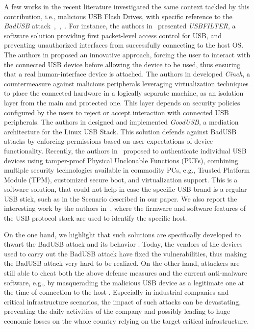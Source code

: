 \documentclass[acmsmall, authorversion]{acmart}
\begin{document}
A few works in the recent literature investigated the same context tackled by this contribution, i.e., malicious USB Flash Drives, with specific reference to the \emph{BadUSB} attack~\cite{Tian2016},~\cite{angel2016_usenix},~\cite{Tian2015}. For instance, the authors in~\cite{Tian2016} presented \emph{USBFILTER}, a software solution providing first packet-level access control for USB, and preventing unauthorized interfaces from successfully connecting to the host \ac{OS}. The authors in \cite{Griscioli2016} proposed an innovative approach, forcing the user to interact with the connected USB device before allowing the device to be used, thus ensuring that a real human-interface device is attached. The authors in \cite{angel2016_usenix} developed \emph{Cinch}, a countermeasure against malicious peripherals leveraging virtualization techniques to place the connected hardware in a logically separate machine, as an isolation layer from the main and protected one. This layer depends on security policies configured by the users to reject or accept interaction with connected USB peripherals. The authors in \cite{Tian2015} designed and implemented \emph{GoodUSB}, a mediation architecture for the Linux USB Stack. This solution defends against BadUSB attacks by enforcing permissions based on user expectations of device functionality. 
Recently, the authors in~\cite{suzaki2019} proposed to authenticate individual USB devices using tamper-proof Physical Unclonable Functions (PUFs), combining multiple security technologies available in commodity PCs, e.g., Trusted Platform Module (TPM), customized secure boot, and virtualization support. This is a software solution, that could not help in case the specific USB brand is a regular USB stick, such as in the Scenario described in our paper. We also report the interesting work by the authors in~\cite{bates2014}, where the firmware and software features of the USB protocol stack are used to identify the specific host.

On the one hand, we highlight that such solutions are specifically developed to thwart the BadUSB attack and its behavior \cite{badusbguide}. Today, the vendors of the devices used to carry out the BadUSB attack have fixed the vulnerabilities, thus making the BadUSB attack very hard to be realized. On the other hand, attackers are still able to cheat both the above defense measures and the current anti-malware software, e.g., by masquerading the malicious USB device as a legitimate one at the time of connection to the host \cite{Tian2016}. Especially in industrial companies and critical infrastructure scenarios, the impact of such attacks can be devastating, preventing the daily activities of the company and possibly leading to huge economic losses on the whole country relying on the target critical infrastructure.
\end{document}
